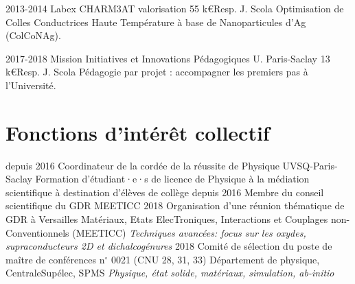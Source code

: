 \documentclass[11pt,a4paper,nolmodern]{moderncv}
\begin{document}
	\cventry
	{2013-2014}
	{Labex CHARM3AT valorisation} {55 k€}{Resp. J. Scola}{}
	{Optimisation de Colles Conductrices Haute Température à base de Nanoparticules d'Ag (ColCoNAg).}

	\cventry
	{2017-2018}
	{Mission Initiatives et Innovations Pédagogiques U. Paris-Saclay} {13 k€}{Resp. J. Scola}{}
	{Pédagogie par projet : accompagner les premiers pas à l'Université.}

\iffalse	
	\subsection{Partenariats}	
	\cventry
	{2009-2011}
	{Partenariat Hubert Curien Pessoa}{}{Resp. français: J. Scola, Resp. portugais: D. S. Schmool}{}
	{\emph{Spin dynamics and magneto-transport in all oxide magnetic multilayers.}}
\fi
	

\newpage 

\section{Fonctions d'intérêt collectif}
\cventry
	{depuis 2016}
	{Coordinateur de la cordée de la réussite de Physique}{}
	{UVSQ-Paris-Saclay}
	{Formation d'étudiant·e·s de licence de Physique à la médiation scientifique à destination d'élèves de collège}
	{}
\cventry
	{depuis 2016}
	{Membre du conseil scientifique du GDR MEETICC}{}
	{}
	{}
	{}
\cventry
	{2018}
	{Organisation d'une réunion thématique de GDR à Versailles}{}
	{Matériaux, Etats ElecTroniques, Interactions et Couplages non-Conventionnels (MEETICC)}
	{\emph{Techniques avancées: focus sur les oxydes, supraconducteurs 2D et dichalcogénures}}
	{}
\cventry
	{2018}
	{Comité de sélection du poste de maître de conférences n$^\circ$ 0021 (CNU 28, 31, 33)}{}
	{Département de physique, CentraleSupélec, SPMS}
	{\emph{Physique, état solide, matériaux, simulation, ab-initio}}{}
\iffalse
\cventry
	{2014}
	{Co-organisation d'un mini-colloque de la Condensed Matter in Paris (CMD25-JMC14)}{}
	{divisions Matière Condensée des Sociétés européenne et française de Physique}
	{\emph{Strongly correlated systems I: Recent advances on metal-insulator transitions of correlated matter}}
	{}
\cventry
	{2011}
	{Comité de sélection du poste de maître de conférences n$^\circ$ 0108 (CNU 28)}{}
	{Institut Galilée, Université Paris 13}
	{\emph{Physique des matériaux fonctionnels et couplage}}{}
\cventry
	{2010}
	{Comité de sélection du poste de maître de conférences n$^\circ$ 0791 (CNU 28)}{}
	{Université de Versailles St-Quentin}
	{\emph{Auto-organisation dans les solides moléculaires photo-commutables}}{}
\cventry
	{2010-2015}
	{Président de jury}
	{Semestre 2 de la première année de Licence, parcours Physique-Chimie}
	{}
	{}{}	
\fi
\end{document}
